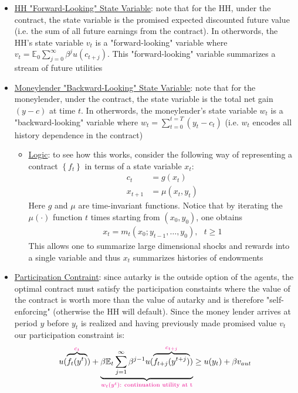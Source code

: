 \documentclass{article}
\begin{document}
\begin{itemize}
    \item  \underline{HH "Forward-Looking" State Variable}: note that for the HH, under the contract, the state variable is the promised expected discounted future value (i.e. the sum of all future earnings from the contract). In otherwords, the HH's state variable $v_{t}$ is a "forward-looking" variable where  $v_{t} = \mathbb{E}_{0} \sum_{j=0}^{\infty} \beta^{j} u(c_{t+j})$. This "forward-looking" variable summarizes a stream of future utilities
    \item \underline{Moneylender "Backward-Looking" State Variable}: note that for the moneylender, under the contract, the state variable is the total net gain $(y- c)$ at time $t$. In otherwords, the moneylender's state variable $w_{t}$ is a "backward-looking" variable where $w_{t} = \sum_{t=0}^{t=T} (y_{t} - c_{t})$ (i.e. $w_{t}$ encodes all history dependence in the contract)
    \begin{itemize}
        \item \underline{Logic}: to see how this works, consider the following way of representing a contract $\left\{ f_{t} \right\}$ in terms of a state variable $x_{t}$:
        \begin{align*}
            c_{t} &= g(x_{t}) \\
            x_{t+1} &= \mu (x_{t}, y_{t})
        \end{align*}
        Here $g$ and $\mu$ are time-invariant functions. Notice that by iterating the $\mu(\cdot)$ function $t$ times starting from $(x_{0}, y_{0})$, one obtains
        \begin{gather*}
            x_{t} = m_{t}(x_{0}; y_{t-1}, \dots, y_{0}), \ \ \ t \geq 1
        \end{gather*}
        This allows one to summarize large dimensional shocks and rewards into a single variable and thus $x_{t}$ summarizes histories of endowments
    \end{itemize}
    \item \underline{Participation Contraint}: since autarky is the outside option of the agents, the optimal contract must satisfy the participation constaints where the value of the contract is worth more than the value of autarky and is therefore "self-enforcing" (otherwise the HH will default). Since the money lender arrives at period $y$ before $y_{t}$ is realized and having previously made promised value $v_{t}$ our participation constraint is:
    \begin{gather*}
        u(\overbrace{f_{t}(y^{t})}^{\begingroup\color{magenta} c_{t} \endgroup}) + \underbrace{\beta \mathbb{E}_{t} \sum_{j=1}^{\infty} \beta^{j-1} u(\overbrace{f_{t+j}(y^{t+j})}^{\begingroup\color{magenta} c_{t+j} \endgroup})}_{\begingroup\color{magenta} w_{t}(y^{t}): \ \text{continuation utility at t} \endgroup} \geq u(y_{t}) + \beta v_{aut}

\end{gather*}
\end{itemize}
\end{document}
